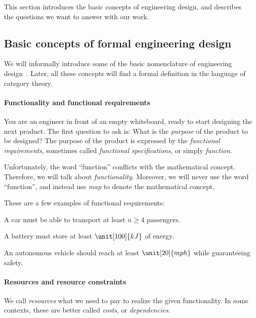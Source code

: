 This section introduces the basic concepts of engineering design, and describes the questions we want to answer with our work.

\subsection{Basic concepts of formal engineering design}
We will informally introduce some of the basic nomenclature of engineering
design~\cite{antonsson2005formal}. Later, all these concepts will find a formal
definition in the language of category theory.

\paragraph{Functionality and functional requirements} You are an engineer in front of an empty whiteboard, ready to start designing the next product.
The first question to ask is: What is the \emph{purpose} of the product to be designed? The purpose of the product is expressed by the \emph{functional requirements}, sometimes called
\emph{functional specifications}, or simply \emph{function}.

Unfortunately, the word ``function'' conflicts with the mathematical concept. Therefore, we
will talk  about \emph{functionality}. Moreover, we will never use the word ``function'', and
instead use \emph{map} to denote the mathematical concept.

\begin{example}
    These are a few examples of functional requirements:
    \begin{compactitem}
        \item A car must be able to transport at least $n \geq 4$ passengers.
        \item A battery must store at least $\unit[100]{kJ}$ of energy.
        \item An autonomous vehicle should reach at least $\unit[20]{mph}$ while guaranteeing safety.
    \end{compactitem}
\end{example}

\paragraph{Resources and resource constraints}

We call \emph{resources} what we need to pay to realize the given functionality.
In some contexts, these are better called \emph{costs}, or \emph{dependencies}.


